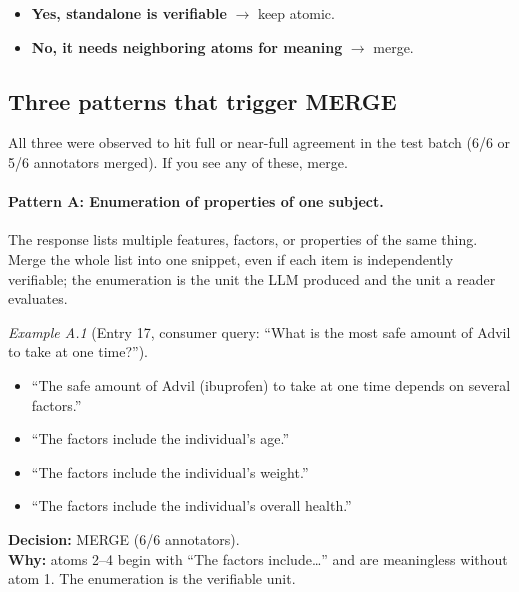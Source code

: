 \documentclass{article}
\begin{document}
\begin{itemize}[leftmargin=*,itemsep=2pt]
    \item \textbf{Yes, standalone is verifiable} $\rightarrow$ keep atomic.
    \item \textbf{No, it needs neighboring atoms for meaning} $\rightarrow$ merge.
\end{itemize}

\subsection{Three patterns that trigger MERGE}
\label{sec:merge-patterns}

All three were observed to hit full or near-full agreement in the test batch (6/6 or 5/6 annotators merged). If you see any of these, merge.

\paragraph{Pattern A: Enumeration of properties of one subject.}
The response lists multiple features, factors, or properties of the same thing. Merge the whole list into one snippet, even if each item is independently verifiable; the enumeration is the unit the LLM produced and the unit a reader evaluates.

\medskip
\noindent\textit{Example A.1} (Entry 17, consumer query: ``What is the most safe amount of Advil to take at one time?'').
\begin{itemize}[leftmargin=1.8em,labelsep=0.5em,itemsep=2pt,topsep=3pt]
    \item[\textit{atom 1:}] ``The safe amount of Advil (ibuprofen) to take at one time depends on several factors.''
    \item[\textit{atom 2:}] ``The factors include the individual's age.''
    \item[\textit{atom 3:}] ``The factors include the individual's weight.''
    \item[\textit{atom 4:}] ``The factors include the individual's overall health.''
\end{itemize}
\noindent\textbf{Decision:} MERGE (6/6 annotators). \\
\noindent\textbf{Why:} atoms 2--4 begin with ``The factors include\ldots{}'' and are meaningless without atom 1. The enumeration is the verifiable unit.
\end{document}
